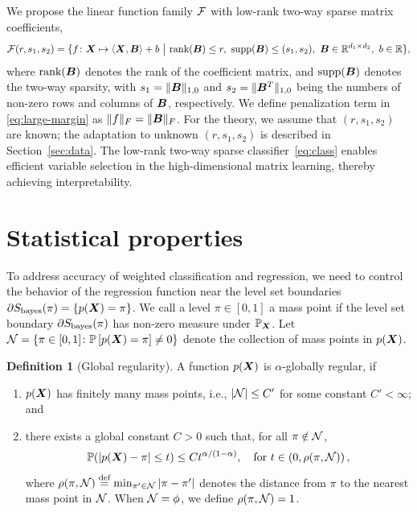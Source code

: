 \documentclass[11pt]{article}
\theoremstyle{definition}
\newtheorem{defn}{Definition}
\def\bayesS{S_{\textup{bayes}}}
\begin{document}
We propose the linear function family $\mathcal{F}$ with low-rank two-way sparse matrix coefficients,
\begin{align}\label{eq:class}
\tF(r,s_1,s_2)=\{f\colon \mX\mapsto \langle \mX, \mB \rangle +b \ \big|\ \text{rank}(\mB)\leq r, \ \text{supp}(\mB)\leq (s_1,s_2), \ \mB\in\mathbb{R}^{d_1\times d_2},\ b\in\mathbb{R}\},
\end{align}
where $\text{rank}(\bm B)$ denotes the rank of the coefficient matrix, and $\text{supp}(\bm B)$ denotes the two-way sparsity, with $s_1=\lVert\bm B\rVert_{1,0}$ and $s_2=\lVert\bm B^T\rVert_{1,0}$ being the numbers of non-zero rows and columns of $\bm B$, respectively. We define penalization term in \eqref{eq:large-margin} as $\lVert f\rVert_F = \lVert\bm B\rVert_F$. For the theory, we assume that $(r,s_1,s_2)$ are known; the adaptation to unknown $(r, s_1, s_2)$  is described in Section~\ref{sec:data}. 
The low-rank two-way sparse classifier~\eqref{eq:class} enables efficient variable selection in the high-dimensional matrix learning, thereby achieving interpretability. 

 



\vspace{-.5cm}
\section{Statistical properties}\label{sec:theory}
\vspace{-.3cm}
To address accuracy of weighted classification and regression, we need to control the behavior of the regression function near the level set boundaries $\partial S_{\text{bayes}}(\pi) = \{ p(\bm X)= \pi\}$. We call a level $\pi\in[0,1]$ a mass point if the level set boundary $\partial \bayesS(\pi)$ has non-zero measure under $\mathbb{P}_{\bm X}$. Let $\mathcal{N}=\{\pi\in[0,1] \colon \mathbb{P}\left[p(\bm X)=\pi\right]\neq 0\}$ denote the collection of mass points in $p(\bm X)$.

\begin{defn} [Global regularity]\label{ass:decboundary}
A function $p(\bm X)$ is $\alpha$-globally regular, if 
\begin{enumerate}[label=(\roman*)]
\item $p(\bm X)$ has finitely many mass points, i.e., $|\mathcal{N}|\leq C'$ for some constant $C'<\infty$; and 
\item 
there exists a global constant $C>0$ such that, for all $\pi \notin \mathcal{N} $,
\[
\mathbb{P}(|p(\bm X)-\pi|\leq t)\leq Ct^{\alpha/(1-\alpha)}, \quad \text{for }t\in \left(0,\rho(\pi,\mathcal{N})\right),
\]
where $\rho(\pi,\mathcal{N})\stackrel{\text{def}}{=}\min_{\pi'\in \mathcal{N}} |\pi-\pi'|$  denotes the distance from $\pi$ to the nearest mass point in $\mathcal{N}$. When $\mathcal{N} = \phi$, we define $\rho(\pi,\mathcal{N})=1$.
\end{enumerate}
\end{defn}
\end{document}
